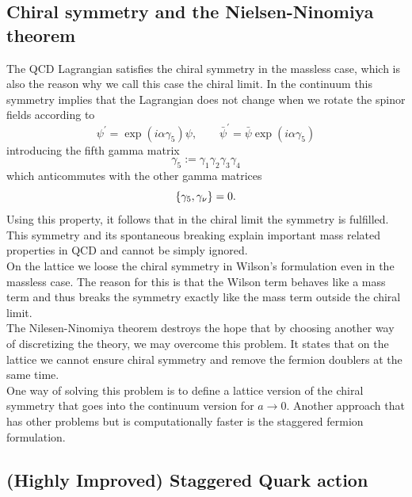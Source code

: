 \subsection{Chiral symmetry and the Nielsen-Ninomiya theorem}
The QCD Lagrangian satisfies the chiral symmetry in the massless case, which is also the reason why we call this case the chiral limit. In the continuum this symmetry implies that the Lagrangian does not change when we rotate the spinor fields according to
\begin{equation}
    \psi^\prime=\exp(i\alpha\gamma_5)\psi,\qquad \bar\psi^\prime=\bar\psi\exp(i\alpha\gamma_5)
\end{equation}
introducing the fifth gamma matrix
\begin{equation}
    \gamma_5:=\gamma_1\gamma_2\gamma_3\gamma_4
\end{equation}
which anticommutes with the other gamma matrices
\begin{equation}
    \left\{\gamma_5,\gamma_\nu \right\}=0.
\end{equation}
Using this property, it follows that in the chiral limit the symmetry is fulfilled. This symmetry and its spontaneous breaking explain important mass related properties in QCD and cannot be simply ignored.\\
On the lattice we loose the chiral symmetry in Wilson's formulation even in the massless case. The reason for this is that the Wilson term behaves like a mass term and thus breaks the symmetry exactly like the mass term outside the chiral limit.\\
The Nilesen-Ninomiya theorem destroys the hope that by choosing another way of discretizing the theory, we may overcome this problem. It states that on the lattice we cannot ensure chiral symmetry and remove the fermion doublers at the same time. \\
One way of solving this problem is to define a lattice version of the chiral symmetry that goes into the continuum version for $a\to 0$. Another approach that has other problems but is computationally faster is the staggered fermion formulation\cite{gattringer}.


\subsection{(Highly Improved) Staggered Quark action}

